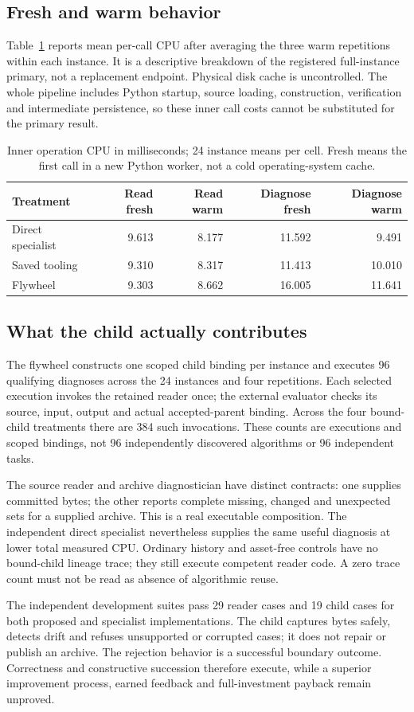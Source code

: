 \subsection{Fresh and warm behavior}
Table~\ref{tab:conditions} reports mean per-call CPU after averaging the three warm repetitions within each instance. It is a descriptive breakdown of the registered full-instance primary, not a replacement endpoint. Physical disk cache is uncontrolled. The whole pipeline includes Python startup, source loading, construction, verification and intermediate persistence, so these inner call costs cannot be substituted for the primary result.

\begin{table}[htbp]\centering\small
\caption{Inner operation CPU in milliseconds; 24 instance means per cell. Fresh means the first call in a new Python worker, not a cold operating-system cache.}
\label{tab:conditions}
\begin{tabularx}{\textwidth}{@{}Xrrrr@{}}\toprule
Treatment & Read fresh & Read warm & Diagnose fresh & Diagnose warm\\\midrule
Direct specialist & 9.613 & 8.177 & 11.592 & 9.491 \\
Saved tooling & 9.310 & 8.317 & 11.413 & 10.010 \\
Flywheel & 9.303 & 8.662 & 16.005 & 11.641 \\
\bottomrule\end{tabularx}
\end{table}

\subsection{What the child actually contributes}
The flywheel constructs one scoped child binding per instance and executes 96 qualifying diagnoses across the 24 instances and four repetitions. Each selected execution invokes the retained reader once; the external evaluator checks its source, input, output and actual accepted-parent binding. Across the four bound-child treatments there are 384 such invocations. These counts are executions and scoped bindings, not 96 independently discovered algorithms or 96 independent tasks.

The source reader and archive diagnostician have distinct contracts: one supplies committed bytes; the other reports complete missing, changed and unexpected sets for a supplied archive. This is a real executable composition. The independent direct specialist nevertheless supplies the same useful diagnosis at lower total measured CPU. Ordinary history and asset-free controls have no bound-child lineage trace; they still execute competent reader code. A zero trace count must not be read as absence of algorithmic reuse.

The independent development suites pass 29 reader cases and 19 child cases for both proposed and specialist implementations. The child captures bytes safely, detects drift and refuses unsupported or corrupted cases; it does not repair or publish an archive. The rejection behavior is a successful boundary outcome. Correctness and constructive succession therefore execute, while a superior improvement process, earned feedback and full-investment payback remain unproved.
